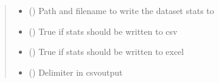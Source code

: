 \documentclass[letterpaper,10pt,english]{sphinxmanual}
\begin{document}
\begin{fulllineitems}
\begin{quote}
\begin{description}
\begin{itemize}
\item {} 
\sphinxAtStartPar
{} () \textendash{} Path and filename to write the dataset stats to

\item {} 
\sphinxAtStartPar
{} () \textendash{} True if stats should be written to csv

\item {} 
\sphinxAtStartPar
{} () \textendash{} True if stats should be written to excel

\item {} 
\sphinxAtStartPar
{} () \textendash{} Delimiter in csv\sphinxhyphen{}output

\end{itemize}

\end{description}\end{quote}

\end{fulllineitems}

\end{document}
